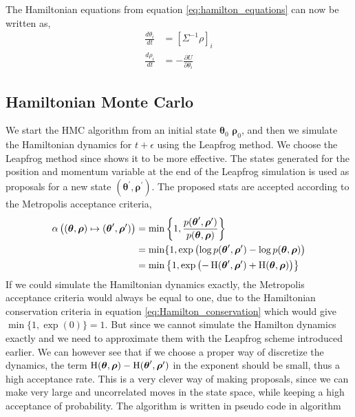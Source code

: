 The Hamiltonian equations from equation \ref{eq:hamilton_equations} can now be written as,
\begin{equation*}
\begin{split}
\frac{d \theta_{i}}{d t}&=\left[\Sigma^{-1}\rho\right]_i \\
\frac{d \rho_{i}}{d t}&=-\frac{\partial U}{\partial \theta_i}
\end{split}
\end{equation*}





\subsection{Hamiltonian Monte Carlo}
We start the HMC algorithm from an initial state $\boldsymbol{\theta}_0$ $\boldsymbol{\rho}_0$, and then we simulate the Hamiltonian dynamics for $t+\epsilon$ using the Leapfrog method. We choose the Leapfrog method since \cite{betancourt2017conceptual} shows it to be more effective. The states generated for the position and momentum variable at the end of the Leapfrog simulation is used as proposals for a new state $(\boldsymbol{\theta}^\prime,\boldsymbol{\rho}^\prime)$. The proposed stats are accepted according to the Metropolis acceptance criteria,
\begin{equation*}
\begin{split}
    \alpha\left((\boldsymbol{\theta},\boldsymbol{\rho}) \mapsto (\boldsymbol{\theta}^\prime , \boldsymbol{\rho}^\prime )\right) &= \min\left\{1, \frac{p(\boldsymbol{\theta}^\prime,\boldsymbol{\rho}^\prime)}{p(\boldsymbol{\theta},\boldsymbol{\rho})} \right\}\\
    &= \min\{1,\exp\left(\log p(\boldsymbol{\theta}^\prime,\boldsymbol{\rho}^\prime)- \log p(\boldsymbol{\theta}, \boldsymbol{\rho})  \right)\\
    &= \min \left\{1,\exp\left(-\operatorname{H}(\boldsymbol{\theta}^\prime,\boldsymbol{\rho}^\prime) +\operatorname{H}(\boldsymbol{\theta},\boldsymbol{\rho})\right) \right\}
\end{split}
\end{equation*}
If we could simulate the Hamiltonian dynamics exactly, the Metropolis acceptance criteria would always be equal to one, due to the Hamiltonian conservation criteria in equation \ref{eq:Hamilton_conservation} which would give $\min \{1, \exp (0)\}=1$. But since we cannot simulate the Hamilton dynamics exactly and we need to approximate them with the Leapfrog scheme introduced earlier. We can however see that if we choose a proper way of discretize the dynamics, the term  $\operatorname{H}(\boldsymbol{\theta},\boldsymbol{\rho})-\operatorname{H}(\boldsymbol{\theta}^\prime,\boldsymbol{\rho}^\prime)$ in the exponent should be small, thus a high acceptance rate. This is a very clever way of making proposals, since we can make very large and uncorrelated moves in the state space, while keeping a high acceptance of probability. The algorithm is written in pseudo code in algorithm 

